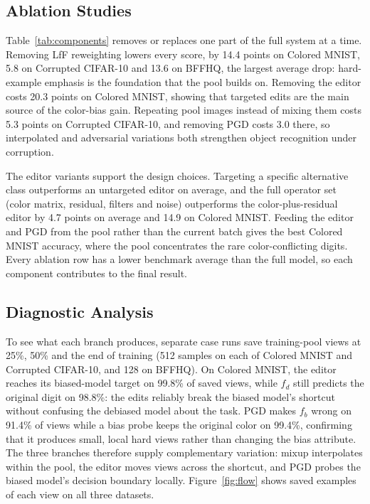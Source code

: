 \documentclass[10pt,twocolumn,letterpaper]{article}
\begin{document}
\subsection{Ablation Studies}

Table~\ref{tab:components} removes or replaces one part of the full system at a time. Removing LfF reweighting lowers every score, by 14.4 points on Colored MNIST, 5.8 on Corrupted CIFAR-10 and 13.6 on BFFHQ, the largest average drop: hard-example emphasis is the foundation that the pool builds on. Removing the editor costs 20.3 points on Colored MNIST, showing that targeted edits are the main source of the color-bias gain. Repeating pool images instead of mixing them costs 5.3 points on Corrupted CIFAR-10, and removing PGD costs 3.0 there, so interpolated and adversarial variations both strengthen object recognition under corruption.

\begin{table}[t]
\centering\small\setlength{\tabcolsep}{3pt}

\caption{PoolForge ablations (conflicting accuracy, \%). $\Delta$ is the change in benchmark average before rounding. Color+residual removes filters and noise together; batch rows use current-batch images instead of pool images.}
\label{tab:components}
\end{table}

The editor variants support the design choices. Targeting a specific alternative class outperforms an untargeted editor on average, and the full operator set (color matrix, residual, filters and noise) outperforms the color-plus-residual editor by 4.7 points on average and 14.9 on Colored MNIST. Feeding the editor and PGD from the pool rather than the current batch gives the best Colored MNIST accuracy, where the pool concentrates the rare color-conflicting digits. Every ablation row has a lower benchmark average than the full model, so each component contributes to the final result.

\subsection{Diagnostic Analysis}
To see what each branch produces, separate case runs save training-pool views at 25\%, 50\% and the end of training (512 samples on each of Colored MNIST and Corrupted CIFAR-10, and 128 on BFFHQ). On Colored MNIST, the editor reaches its biased-model target on 99.8\% of saved views, while $f_d$ still predicts the original digit on 98.8\%: the edits reliably break the biased model's shortcut without confusing the debiased model about the task. PGD makes $f_b$ wrong on 91.4\% of views while a bias probe keeps the original color on 99.4\%, confirming that it produces small, local hard views rather than changing the bias attribute. The three branches therefore supply complementary variation: mixup interpolates within the pool, the editor moves views across the shortcut, and PGD probes the biased model's decision boundary locally. Figure~\ref{fig:flow} shows saved examples of each view on all three datasets.
\end{document}
